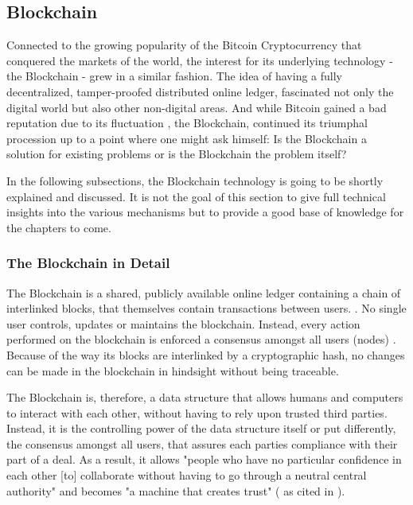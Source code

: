 \subsection{Blockchain}
\label{subsec:02_blockchain}

Connected to the growing popularity of the Bitcoin Cryptocurrency that conquered the markets of the world, the interest for its underlying technology - the Blockchain - grew in a similar fashion. The idea of having a fully decentralized, tamper-proofed distributed online ledger, fascinated not only the digital world but also other non-digital areas. And while Bitcoin gained a bad reputation due to its fluctuation \cite{Shackelford2016}, the Blockchain, continued its triumphal procession up to a point where one might ask himself: Is the Blockchain a solution for existing problems or is the Blockchain the problem itself? \cite{Stinchcombe2017} \cite{Nielsen2018} \cite{Lunn2015}

In the following subsections, the Blockchain technology is going to be shortly explained and discussed. It is not the goal of this section to give full technical insights into the various mechanisms but to provide a good base of knowledge for the chapters to come.

\subsubsection{The Blockchain in Detail}
The Blockchain is a shared, publicly available online ledger containing a chain of interlinked blocks, that themselves contain transactions between users. \cite{Wust2017}. No single user controls, updates or maintains the blockchain. Instead, every action performed on the blockchain is enforced a consensus amongst all users (nodes) \cite{Shackelford2016}. Because of the way its blocks are interlinked by a cryptographic hash, no changes can be made in the blockchain in hindsight without being traceable.

The Blockchain is, therefore, a data structure that allows humans and computers to interact with each other, without having to rely upon trusted third parties. Instead, it is the controlling power of the data structure itself or put differently, the consensus amongst all users, that assures each parties compliance with their part of a deal. As a result, it allows "people who have no particular confidence in each other [to] collaborate without having to go through a neutral central authority" and becomes "a machine that creates trust" (\cite{Economist2015} as cited in \cite{Shackelford2016}).
